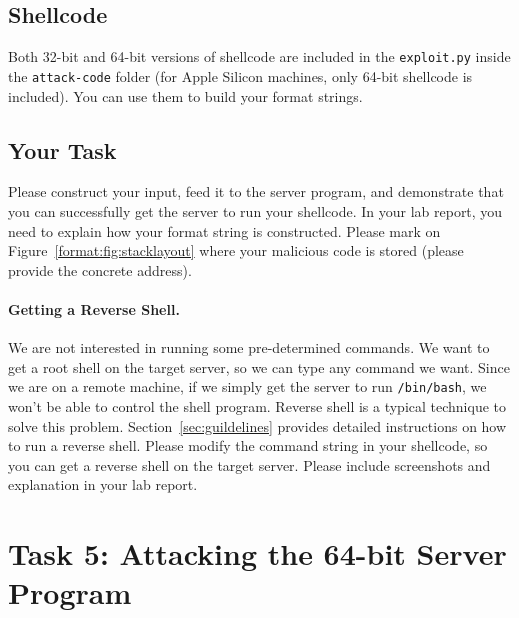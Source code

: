 \subsection{Shellcode} 



Both 32-bit and 64-bit versions of shellcode are included in 
the \texttt{exploit.py} inside the \texttt{attack-code} folder (for 
Apple Silicon machines, only 64-bit shellcode is included). 
You can use them to build your format strings. 


\subsection{Your Task} 

Please construct your input, feed it to the server program, and demonstrate that you can
successfully get the server to run your shellcode. 
In your lab report, you need to explain
how your format string is constructed. Please mark on Figure~\ref{format:fig:stacklayout} where 
your malicious code is stored (please provide the concrete address). 


\paragraph{Getting a Reverse Shell.}
We are not interested in running some pre-determined commands. We
want to get a root shell on the target server, so we can
type any command we want. Since we are on a remote machine,
if we simply get the server to run \texttt{/bin/bash}, we won't be able to
control the shell program. Reverse shell is a typical
technique to solve this problem. Section~\ref{sec:guildelines} provides
detailed instructions on how to run a reverse shell.
Please modify the command string in your shellcode, so you can
get a reverse shell on the target server.
Please include screenshots and explanation in your lab report.



\section{Task 5: Attacking the 64-bit Server Program}

